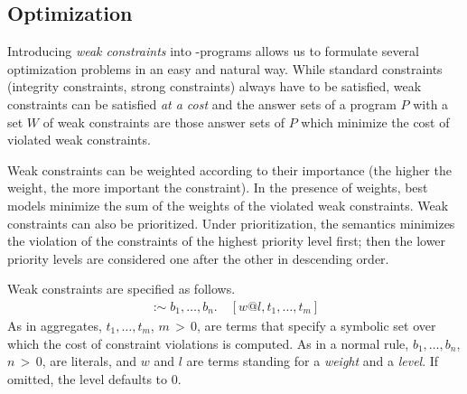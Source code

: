 \documentclass[a4paper, titlepage]{article}
\DeclareMathOperator{\weakimpl}{:\sim}
\newcommand{\gts}{\,{>}\,}
\begin{document}
\subsection{Optimization}
\label{optimize}
Introducing \emph{weak constraints} into \hex-programs 
allows us to formulate several optimization problems in an 
easy and natural way.
While standard constraints (integrity 
constraints, strong constraints) always have to be 
satisfied, weak constraints can be satisfied
\emph{at a cost}
and the answer sets of a program $P$ with a set $W$ of weak 
constraints are those answer sets of $P$ which minimize the 
cost of violated weak constraints.

Weak constraints can be weighted according to their 
importance (the higher the weight, the more important the 
constraint). In the presence of weights, best models 
minimize the sum of the weights of the violated weak 
constraints. Weak constraints can also be prioritized. 
Under prioritization, the semantics minimizes the violation 
of the constraints of the highest priority level first; 
then the lower priority levels are considered one after the 
other in descending order.

Weak constraints 
are specified as follows.
\begin{align*}
\weakimpl \mathit{b_1,\dots,b_n}.
\quad [\mathit{w}@\mathit{l},\mathit{t_1,\dots,t_m}] 
\end{align*}
As in aggregates,
$\mathit{t_1,\dots,t_m}$, $m \gts 0$, are terms that specify a symbolic set
over which the cost of constraint violations is computed.
%
As in a normal rule, $\mathit{b_1,\dots,b_n}$, $n \gts 0$,
are literals,
and $w$ and $l$ are terms standing for a \emph{weight} and a \emph{level}.
%
If omitted, the level defaults to 0.
\end{document}

